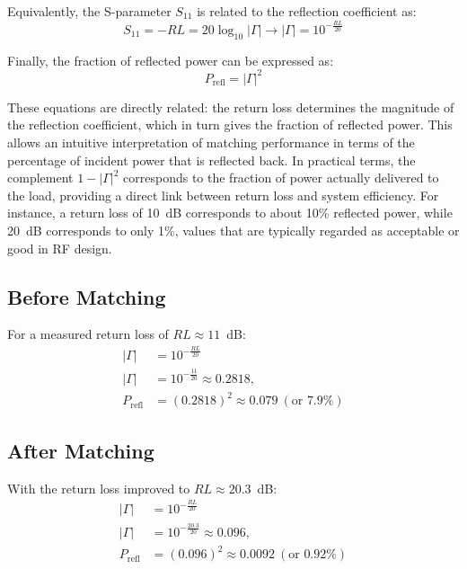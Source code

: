 Equivalently, the S-parameter $S_{11}$ is related to the reflection coefficient as:
\begin{equation}
\label{eq:S11}
S_{11} = -RL = 20 \log_{10} |\Gamma| \xrightarrow{} |\Gamma| = 10^{-\tfrac{RL}{20}}
\end{equation}

Finally, the fraction of reflected power can be expressed as:
\begin{equation}
\label{eq:Preflected}
P_{\text{refl}} = |\Gamma|^2
\end{equation}

These equations are directly related: the return loss determines the magnitude of the reflection coefficient, which in turn gives the fraction of reflected power. This allows an intuitive interpretation of matching performance in terms of the percentage of incident power that is reflected back. In practical terms, the complement $1-|\Gamma|^2$ corresponds to the fraction of power actually delivered to the load, providing a direct link between return loss and system efficiency. For instance, a return loss of 10~dB corresponds to about 10\% reflected power, while 20~dB corresponds to only 1\%, values that are typically regarded as acceptable or good in RF design.


\subsection*{Before Matching}
For a measured return loss of $RL \approx 11$~dB:
\begin{align}
|\Gamma| &= 10^{-\tfrac{RL}{20}} \label{eq:Gamma}\\
|\Gamma| &= 10^{-\tfrac{11}{20}} \approx 0.2818, \label{eq:GammaBefore}\\
P_{\text{refl}} &= (0.2818)^2 \approx 0.079 \ (\text{or } 7.9\%)
\end{align}

\subsection*{After Matching}
With the return loss improved to $RL \approx 20.3$~dB:
\begin{align}
|\Gamma| &= 10^{-\tfrac{RL}{20}} \\
|\Gamma| &= 10^{-\tfrac{20.3}{20}} \approx 0.096, \label{eq:GammaAfter}\\
P_{\text{refl}} &= (0.096)^2 \approx 0.0092 \ (\text{or } 0.92\%)
\end{align}

